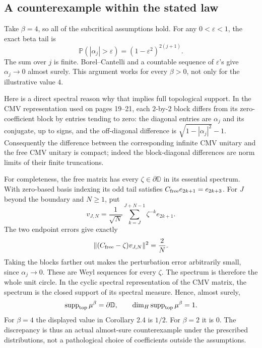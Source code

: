 \documentclass[10pt]{article}
\begin{document}
\subsection*{A counterexample within the stated law}
Take \(\beta=4\), so all of the subcritical assumptions hold. For any \(0<\varepsilon<1\), the exact beta tail is \[\mathbb P(|\alpha_j|>\varepsilon)
   =(1-\varepsilon^2)^{2(j+1)}.\] The sum over \(j\) is finite. Borel–Cantelli and a countable sequence of \(\varepsilon\)’s give \(\alpha_j\to0\) almost surely. This argument works for every \(\beta>0\), not only for the illustrative value \(4\).\par
Here is a direct spectral reason why that implies full topological support. In the CMV representation used on pages 19–21, each \(2\)-by-\(2\) block differs from its zero-coefficient block by entries tending to zero: the diagonal entries are \(\alpha_j\) and its conjugate, up to signs, and the off-diagonal difference is \(\sqrt{1-|\alpha_j|^2}-1\). Consequently the difference between the corresponding infinite CMV unitary and the free CMV unitary is compact; indeed the block-diagonal differences are norm limits of their finite truncations.\par
For completeness, the free matrix has every \(\zeta\in\partial\mathbb D\) in its essential spectrum. With zero-based basis indexing its odd tail satisfies \(C_{\rm free}e_{2k+1}=e_{2k+3}\). For \(J\) beyond the boundary and \(N\ge1\), put \[v_{J,N}=\frac1{\sqrt N}
       \sum_{k=J}^{J+N-1}\zeta^{-k}e_{2k+1}.\] The two endpoint errors give exactly \[\|(C_{\rm free}-\zeta)v_{J,N}\|^2=\frac2N.\] Taking the blocks farther out makes the perturbation error arbitrarily small, since \(\alpha_j\to0\). These are Weyl sequences for every \(\zeta\). The spectrum is therefore the whole unit circle. In the cyclic spectral representation of the CMV matrix, the spectrum is the closed support of its spectral measure. Hence, almost surely, \[\operatorname{supp}_{\rm top}\mu^\beta=\partial\mathbb D,\qquad
 \dim_H\operatorname{supp}_{\rm top}\mu^\beta=1 .\] For \(\beta=4\) the displayed value in Corollary 2.4 is \(1/2\). For \(\beta=2\) it is \(0\). The discrepancy is thus an actual almost-sure counterexample under the prescribed distributions, not a pathological choice of coefficients outside the assumptions.\par
\end{document}
